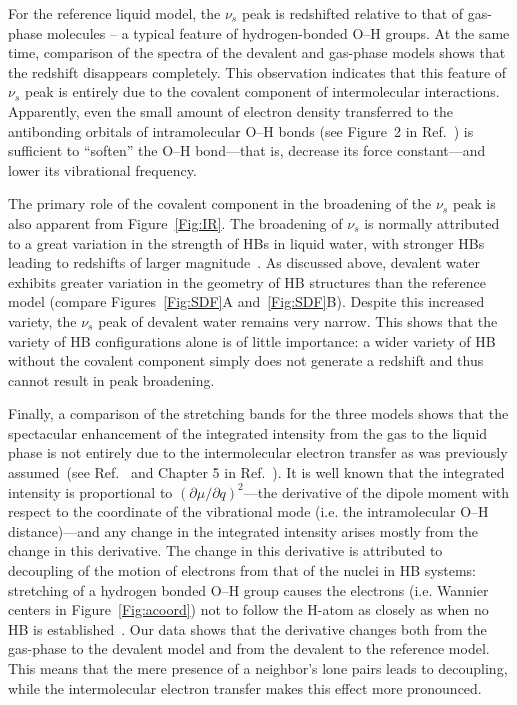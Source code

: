 \documentclass[journal=jacsat,manuscript=article]{achemso}
\begin{document}
For the reference liquid model, the $\nu_s$ peak is redshifted relative to that of gas-phase molecules -- a typical feature of hydrogen-bonded O--H groups.
At the same time, comparison of the spectra of the devalent and gas-phase models shows that the redshift disappears completely. 
This observation indicates that this feature of $\nu_s$ peak is entirely due to the covalent component of intermolecular interactions. 
Apparently, even the small amount of electron density transferred to the antibonding orbitals of intramolecular O--H bonds (see Figure~2 in Ref.~) is sufficient to ``soften'' the O--H bond---that is, decrease its force constant---and lower its vibrational frequency. 

The primary role of the covalent component in the broadening of the $\nu_s$ peak is also apparent from Figure~\ref{Fig:IR}. 
The broadening of $\nu_s$ is normally attributed to a great variation in the strength of HBs in liquid water, with stronger HBs leading to redshifts of larger magnitude~\cite{joseph2007red}. 
As discussed above, devalent water exhibits greater variation in the geometry of HB structures than the reference model (compare Figures~\ref{Fig:SDF}A and~\ref{Fig:SDF}B). 
Despite this increased variety, the $\nu_s$ peak of devalent water remains very narrow. This shows that the variety of HB configurations alone is of little importance: a wider variety of HB without the covalent component simply does not generate a redshift and thus cannot result in peak broadening. 


Finally, a comparison of the stretching bands for the three models shows that the spectacular enhancement of the integrated intensity from the gas to the liquid phase is not entirely due to the intermolecular electron transfer as was previously assumed~(see Ref.~ and Chapter 5 in Ref.~). 
It is well known that the integrated intensity is proportional to $\left({\partial \mu}/{\partial q}\right)^2$---the derivative of the dipole moment with respect to the coordinate of the vibrational mode (i.e. the intramolecular O--H distance)---and any change in the integrated intensity arises mostly from the change in this derivative. 
The change in this derivative is attributed to decoupling of the motion of electrons from that of the nuclei in HB systems: stretching of a hydrogen bonded O--H group causes the electrons (i.e. Wannier centers in Figure~\ref{Fig:acoord}) not to follow the H-atom as closely as when no HB is established~\cite{marechal2006hydrogen}. 
Our data shows that the derivative changes both from the gas-phase to the devalent model and from the devalent to the reference model. 
This means that the mere presence of a neighbor's lone pairs leads to decoupling, while the intermolecular electron transfer makes this effect more pronounced.
\end{document}
